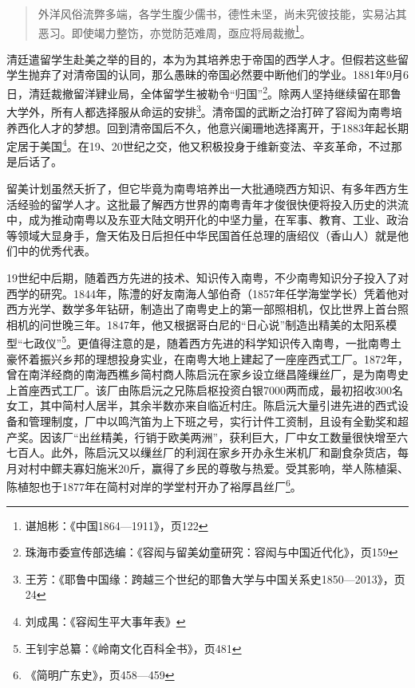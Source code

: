\begin{quote}

外洋风俗流弊多端，各学生腹少儒书，德性未坚，尚未究彼技能，实易沾其恶习。即使竭力整饬，亦觉防范难周，亟应将局裁撤\footnote{谌旭彬：《中国1864—1911》，页122}。

\end{quote}


清廷遣留学生赴美之举的目的，本为为其培养忠于帝国的西学人才。但假若这些留学生抛弃了对清帝国的认同，那么愚昧的帝国必然要中断他们的学业。1881年9月6日，清廷裁撤留洋肄业局，全体留学生被勒令“归国”\footnote{珠海市委宣传部选编：《容闳与留美幼童研究：容闳与中国近代化》，页159}。除两人坚持继续留在耶鲁大学外，所有人都选择服从命运的安排\footnote{王芳：《耶鲁中国缘：跨越三个世纪的耶鲁大学与中国关系史1850—2013》，页24}。清帝国的武断之治打碎了容闳为南粤培养西化人才的梦想。回到清帝国后不久，他意兴阑珊地选择离开，于1883年起长期定居于美国\footnote{刘成禺：《容闳生平大事年表》}。在19、20世纪之交，他又积极投身于维新变法、辛亥革命，不过那是后话了。

留美计划虽然夭折了，但它毕竟为南粤培养出一大批通晓西方知识、有多年西方生活经验的留学人才。这批最了解西方世界的南粤青年才俊很快便将投入历史的洪流中，成为推动南粤以及东亚大陆文明开化的中坚力量，在军事、教育、工业、政治等领域大显身手，詹天佑及日后担任中华民国首任总理的唐绍仪（香山人）就是他们中的优秀代表。

19世纪中后期，随着西方先进的技术、知识传入南粤，不少南粤知识分子投入了对西学的研究。1844年，陈澧的好友南海人邹伯奇（1857年任学海堂学长）凭着他对西方光学、数学多年钻研，制造出了南粤史上的第一部照相机，仅比世界上首台照相机的问世晚三年。1847年，他又根据哥白尼的“日心说”制造出精美的太阳系模型“七政仪”\footnote{王钊宇总纂：《岭南文化百科全书》，页481}。更值得注意的是，随着西方先进的科学知识传入南粤，一批南粤土豪怀着振兴乡邦的理想投身实业，在南粤大地上建起了一座座西式工厂。1872年，曾在南洋经商的南海西樵乡简村商人陈启沅在家乡设立继昌隆缫丝厂，是为南粤史上首座西式工厂。该厂由陈启沅之兄陈启枢投资白银7000两而成，最初招收300名女工，其中简村人居半，其余半数亦来自临近村庄。陈启沅大量引进先进的西式设备和管理制度，厂中以鸣汽笛为上下班之号，实行计件工资制，且设有全勤奖和超产奖。因该厂“出丝精美，行销于欧美两洲”，获利巨大，厂中女工数量很快增至六七百人。此外，陈启沅又以缫丝厂的利润在家乡开办永生米机厂和副食杂货店，每月对村中鳏夫寡妇施米20斤，赢得了乡民的尊敬与热爱。受其影响，举人陈植渠、陈植恕也于1877年在简村对岸的学堂村开办了裕厚昌丝厂\footnote{《简明广东史》，页458—459}。

